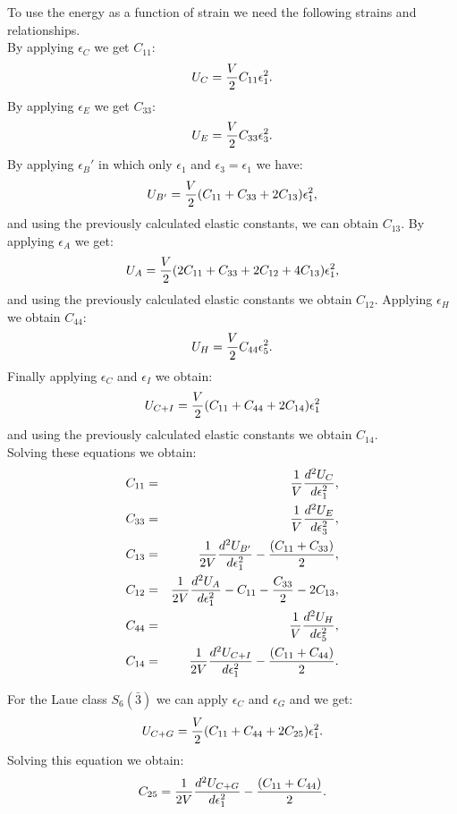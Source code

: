 \documentclass[12pt,a4paper,twoside]{report}
\begin{document}
To use the energy as a function of strain 
we need the following strains and relationships. \\
By applying $\epsilon_C$ we get $C_{11}$:
\begin{equation}
U_C = {V \over 2} C_{11} \epsilon_1^2. 
\end{equation}
By applying $\epsilon_E$ we get $C_{33}$:
\begin{equation}
U_E = {V \over 2} C_{33} \epsilon_3^2. 
\end{equation}
By applying $\epsilon_B'$ in which only $\epsilon_1$ and 
$\epsilon_3=\epsilon_1$ we have:
\begin{equation}
U_{B'} = {V \over 2} (C_{11}+C_{33}+2C_{13}) \epsilon_1^2, 
\end{equation}
and using the previously calculated elastic constants, we can obtain
$C_{13}$. By applying $\epsilon_A$ we get:
\begin{equation}
U_{A} = {V \over 2} (2C_{11}+C_{33}+2C_{12}+4C_{13}) \epsilon_1^2,
\end{equation}
and using the previously calculated elastic constants we obtain $C_{12}$.
Applying $\epsilon_H$ we obtain $C_{44}$:
\begin{equation}
U_{H} = {V \over 2} C_{44} \epsilon_5^2.
\end{equation}
Finally applying $\epsilon_C$ and $\epsilon_I$ we obtain:
\begin{equation}
U_{C+I} = {V \over 2} (C_{11} + C_{44}+ 2 C_{14}) \epsilon_1^2 
\end{equation}
and using the previously calculated elastic constants we obtain $C_{14}$. \\
Solving these equations we obtain:
\begin{eqnarray}
C_{11} &=& {1 \over V} {d^2 U_C \over d \epsilon_1^2}, \\
C_{33} &=& {1 \over V} {d^2 U_E \over d \epsilon_3^2}, \\
C_{13} &=& {1 \over 2 V} {d^2 U_{B'} \over d \epsilon_1^2} - 
{(C_{11} + C_{33})\over 2}, \\
C_{12} &=& {1 \over 2 V} {d^2 U_{A} \over d \epsilon_1^2} - 
C_{11} - {C_{33}\over 2} - 2 C_{13}, \\
C_{44} &=& {1 \over V} {d^2 U_H \over d \epsilon_5^2}, \\
C_{14} &=& {1 \over 2 V} {d^2 U_{C+I} \over d \epsilon_1^2} - 
{(C_{11} + C_{44})\over 2}. 
\end{eqnarray}

For the Laue class $S_6(\bar 3)$ we can apply 
$\epsilon_C$ and $\epsilon_G$ and we get:
\begin{equation}
U_{C+G} = {V \over 2} (C_{11} + C_{44}+ 2 C_{25}) \epsilon_1^2. 
\end{equation}
Solving this equation we obtain:
\begin{equation}
C_{25} = {1 \over 2 V} {d^2 U_{C+G} \over d \epsilon_1^2} - 
{(C_{11} + C_{44})\over 2}.
\end{equation}
\end{document}
